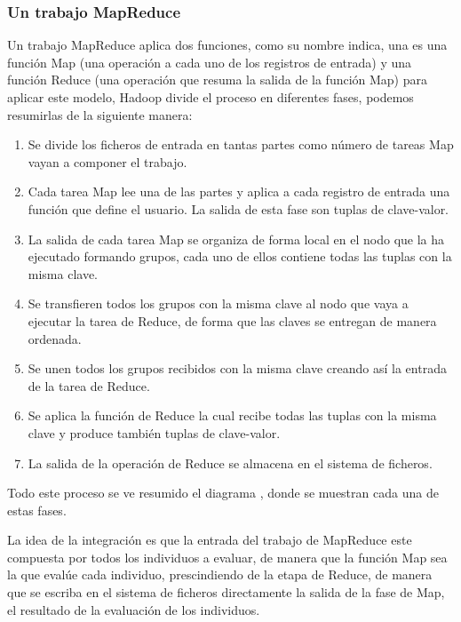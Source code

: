 \subsubsection{Un trabajo MapReduce}


Un trabajo MapReduce aplica dos funciones, como su nombre indica, una es una función Map (una operación a cada uno de los registros de entrada) y una función Reduce (una operación que resuma la salida de la función Map) para aplicar este modelo, Hadoop divide el proceso en diferentes fases, podemos resumirlas de la siguiente manera:

\begin{enumerate}
	\item Se divide los ficheros de entrada en tantas partes como n\'umero de tareas Map vayan a componer el trabajo.
	\item Cada tarea Map lee una de las partes y aplica a cada registro de entrada una función que define el usuario. La salida de esta fase son tuplas de clave-valor.
	\item La salida de cada tarea Map se organiza de forma local en el nodo que la ha ejecutado formando grupos, cada uno de ellos contiene todas las tuplas con la misma clave.
	\item Se transfieren todos los grupos con la misma clave al nodo que vaya a ejecutar la tarea de Reduce, de forma que las claves se entregan de manera ordenada.
	\item Se unen todos los grupos recibidos con la misma clave creando así la entrada de la tarea de Reduce.
	\item Se aplica la función de Reduce la cual recibe todas las tuplas con la misma clave y produce también tuplas de clave-valor.
	\item La salida de la operación de Reduce se almacena en el sistema de ficheros.
\end{enumerate}

Todo este proceso se ve resumido el diagrama , donde se muestran cada una de estas fases.

\label{fase-map-eval}
La idea de la integración es que la entrada del trabajo de MapReduce este compuesta por todos los individuos a evaluar, de manera que la función Map sea la que evalúe cada individuo, prescindiendo de la etapa de Reduce, de manera que se escriba en el sistema de ficheros directamente la salida de la fase de Map, el resultado de la evaluación de los individuos.











